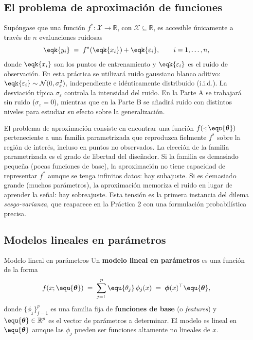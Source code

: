\subsection*{El problema de aproximación de funciones}
\label{sec:problema_aprox}

Supóngase que una función $f^* : \mathcal{X} \to \mathbb{R}$, con
$\mathcal{X} \subseteq \mathbb{R}$, es accesible únicamente a través de
$n$ evaluaciones ruidosas
\[
  \eqk{y_i} \;=\; f^*(\eqk{x_i}) + \eqk{\varepsilon_i},
  \qquad i = 1, \ldots, n,
\]
donde $\eqk{x_i}$ son los puntos de entrenamiento y $\eqk{\varepsilon_i}$ es
el ruido de observación. En esta práctica se utilizará ruido gaussiano blanco
aditivo: $\eqk{\varepsilon_i} \sim \mathcal{N}(0, \sigma_\varepsilon^2)$,
independiente e idénticamente distribuido (i.i.d.). La desviación típica
$\sigma_\varepsilon$ controla la intensidad del ruido. En la Parte A se
trabajará sin ruido ($\sigma_\varepsilon = 0$), mientras que en la Parte B
se añadirá ruido con distintos niveles para estudiar su efecto sobre la
generalización.

El problema de aproximación consiste en encontrar una función
$f(\cdot;\equ{\boldsymbol{\theta}})$ perteneciente a una familia
parametrizada que reproduzca fielmente $f^*$ sobre la región de interés,
incluso en puntos no observados. La elección de la familia parametrizada es el grado de libertad del
diseñador. Si la familia es demasiado pequeña (pocas funciones de base),
la aproximación no tiene capacidad de representar $f^*$ aunque se tenga
infinitos datos: hay subajuste. Si es demasiado grande (muchos parámetros),
la aproximación memoriza el ruido en lugar de aprender la señal: hay
sobreajuste. Esta tensión es la primera instancia del dilema
\emph{sesgo-varianza}, que reaparece en la Práctica 2 con una formulación
probabilística precisa.

\subsection*{Modelos lineales en parámetros}
\label{sec:modelos_lineales}

\begin{definicion}{Modelo lineal en parámetros}
\label{def:modelo_lineal}
Un \textbf{modelo lineal en parámetros} es una función de la forma
\[
  f(x;\equ{\boldsymbol{\theta}}) \;=\; \sum_{j=1}^{p} \equ{\theta_j}\,\phi_j(x)
  \;=\; \boldsymbol{\phi}(x)^\top \equ{\boldsymbol{\theta}},
\]
donde $\{\phi_j\}_{j=1}^p$ es una familia fija de \textbf{funciones de base}
(o \textit{features}) y $\equ{\boldsymbol{\theta}} \in \mathbb{R}^p$ es el
vector de parámetros a determinar. El modelo es lineal en
$\equ{\boldsymbol{\theta}}$ aunque las $\phi_j$ pueden ser funciones
altamente no lineales de $x$.
\end{definicion}

